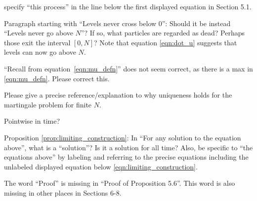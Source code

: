 \begin{point}{\revref}
specify ``this process'' in the line below the first displayed equation in
Section 5.1.
\end{point}


\begin{point}{\revref}
Paragraph starting with ``Levels never cross below 0'': Should it be instead ``Levels never
go above $N$''? If so, what particles are regarded as dead? Perhaps those exit the interval
$[0, N]$? Note that equation \eqref{eqn:dot_u} suggests that levels can now go above $N$.
\end{point}


\begin{point}{\revref}
``Recall from equation~\eqref{eqn:mu_defn}''
does not seem correct, as there is a max in \eqref{eqn:mu_defn}. Please
correct this.
\end{point}


\begin{point}{\revref}
Please give a precise reference/explanation to why uniqueness holds for the martingale problem for finite $N$.
\end{point}


\begin{point}{\revref}
    Pointwise in time?
\end{point}


\begin{point}{\revref}
Proposition \ref{prop:limiting_construction}: In ``For any solution to the equation above'', what is a ``solution''? Is it
a solution for all time? Also, be specific to ``the equations above'' by labeling and referring
to the precise equations including the unlabeled displayed equation below \eqref{eqn:limiting_construction}.
\end{point}


\begin{point}{}
The word ``Proof'' is missing in ``Proof of Proposition 5.6''. This word is also
missing in other places in Sections 6-8.
\end{point}

